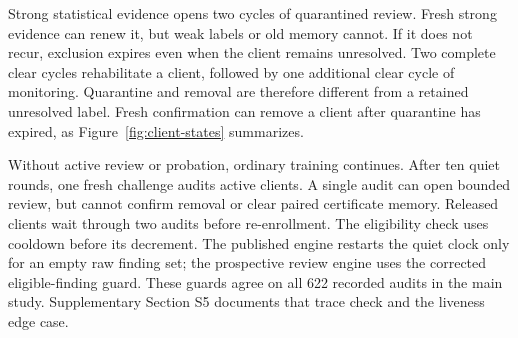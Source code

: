 \documentclass[journal]{IEEEtran}
\begin{document}
Strong statistical evidence opens two cycles of quarantined review.
Fresh strong evidence can renew it, but weak labels or old memory cannot.
If it does not recur, exclusion expires even when the client remains
unresolved. Two complete clear cycles rehabilitate a client, followed by
one additional clear cycle of monitoring. Quarantine and removal are
therefore different from a retained unresolved label. Fresh confirmation
can remove a client after quarantine has expired, as
Figure~\ref{fig:client-states} summarizes.

Without active review or probation, ordinary training continues. After
ten quiet rounds, one fresh challenge audits active clients. A single
audit can open bounded review, but cannot confirm removal or clear
paired certificate memory. Released clients wait through two audits
before re-enrollment. The eligibility check uses cooldown before its
decrement. The published engine restarts the quiet clock only for an
empty raw finding set; the prospective review engine uses the corrected
eligible-finding guard. These guards agree on all 622 recorded audits
in the main study. Supplementary Section S5 documents that trace check
and the liveness edge case.
\end{document}
